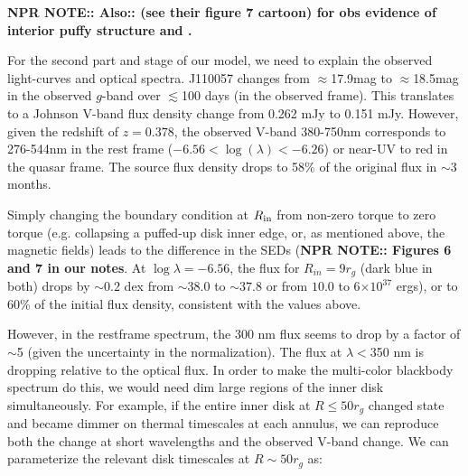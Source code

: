 \documentclass[11pt,a4paper]{article}
\begin{document}
{\bf NPR NOTE:: Also:: \citet{Gardner_Done2017} 
(see their figure 7 cartoon) for obs evidence of interior puffy structure
and \citet{Jiang_Stone_Davis2016}. 
}

For the second part and stage of our model, we need to explain the
observed light-curves and optical spectra. J110057 changes from
$\approx$17.9mag to $\approx$18.5mag in the observed $g$-band over
$\lesssim$100 days (in the observed frame).  This translates to a
Johnson V-band flux density change from 0.262 mJy to 0.151 mJy.
However, given the redshift of $z=0.378$, the observed V-band
380-750nm corresponds to 276-544nm in the rest frame ($-6.56 < \log
(\lambda) < -6.26$) or near-UV to red in the quasar frame. The source
flux density drops to 58\% of the original flux in $\sim$3 months.

Simply changing the boundary condition at $R_{\rm in}$ from non-zero
torque to zero torque (e.g. collapsing a puffed-up disk inner edge,
or, as mentioned above, the magnetic fields) leads to the difference
in the SEDs ({\bf NPR NOTE:: Figures 6 and 7 in our notes}.  At $\log
\lambda = −6.56$, the flux for $R_{in} = 9 r_{g}$ (dark blue in both)
drops by $\sim0.2$ dex from $\sim38.0$ to $\sim37.8 $ or from $10.0$
to 6$\times 10^{37}$ ergs), or to 60\% of the initial flux density,
consistent with the values above.

However, in the restframe spectrum, the 300 nm flux seems to drop by a
factor of $\sim$5 (given the uncertainty in the normalization). The
flux at $\lambda < $350 nm is dropping relative to the optical
flux. In order to make the multi-color blackbody spectrum do this, we
would need dim large regions of the inner disk simultaneously.  For
example, if the entire inner disk at $R \leq 50 r_{g}$ changed state
and became dimmer on thermal timescales at each annulus, we can
reproduce both the change at short wavelengths and the observed V-band
change.
We can parameterize the relevant disk timescales at $R\sim 50 r_{g}$ as:
\end{document}
